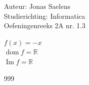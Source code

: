 \documentclass[a4paper]{article}
\begin{document}
\noindent \large Auteur: Jonas Saelens \\
\noindent \large Studierichting: Informatica\\
\noindent \large Oefeningenreeks 2A nr. 1.3\\

\medskip

\normalsize

$f(x)=-x$\\

$\operatorname{dom}f=\mathbb{R}$\\

$\operatorname{Im}f=\mathbb{R}$\\

\begin{thebibliography}{999}
\end{thebibliography}
\end{document}
